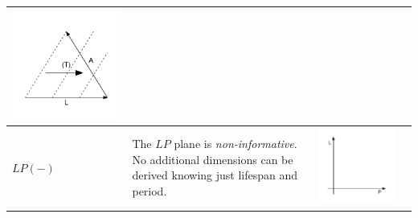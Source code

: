 \documentclass[11pt,oneside,a4paper]{article} %
\begin{document}
\begin{center}
\begin{longtable}{m{}m{}m{}m{}}
  \includegraphics[width = \linewidth]{Figures/JonasTable/ALt_iso.pdf}  \\
  \midrule
  $LP(-)$ &
  The $LP$ plane is \emph{non-informative}. No additional dimensions can be derived knowing just lifespan and period. &
  \includegraphics[width = \linewidth]{Figures/JonasTable/LP.pdf} &

\end{longtable}
\end{center}
\end{document}
